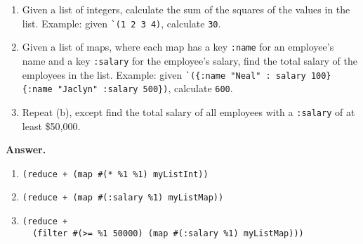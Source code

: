 \documentclass[9pt]{article}
\begin{document}
\begin{enumerate}
\begin{enumerate}
            \item Given a list of integers, calculate the sum of the squares of
                  the values in the list. Example: given \verb|`(1 2 3 4)|,
                  calculate \verb|30|.
            \item Given a list of maps, where each map has a key \verb|:name|
                  for an employee's name and a key \verb|:salary| for the
                  employee's salary, find the total salary of the employees in
                  the list. Example: given \verb|`({:name "Neal" : salary 100}|
                  \verb| {:name "Jaclyn" :salary 500})|, calculate \verb|600|.
            \item Repeat (b), except find the total salary of all employees with
                  a \verb|:salary| of at least \$50,000.
         \end{enumerate}

      \textbf{Answer.}
      
      \begin{enumerate}
         \item \verb|(reduce + (map #(* %1 %1) myListInt))|
         \item \verb|(reduce + (map #(:salary %1) myListMap))|
         \item \verb|(reduce +| \\
               \verb|  (filter #(>= %1 50000) (map #(:salary %1) myListMap)))|
      \end{enumerate}
\end{enumerate}
\end{document}
